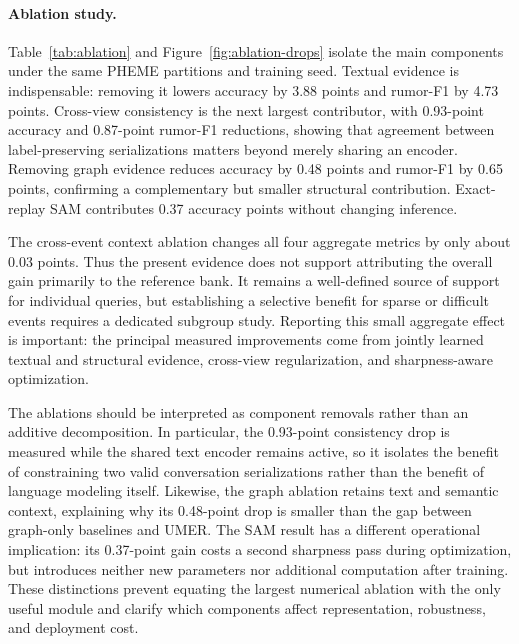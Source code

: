 \documentclass[sigconf,anonymous,review]{../acmart/acmart}
\newcommand{\method}{\textsc{UMER}}
\begin{document}
\paragraph{Ablation study.}
Table~\ref{tab:ablation} and Figure~\ref{fig:ablation-drops} isolate the main
components under the same PHEME partitions and training seed.  Textual evidence
is indispensable: removing it lowers accuracy by 3.88 points and rumor-F1 by
4.73 points.  Cross-view consistency is the next largest contributor, with
0.93-point accuracy and 0.87-point rumor-F1 reductions, showing that agreement
between label-preserving serializations matters beyond merely sharing an
encoder.  Removing graph evidence reduces accuracy by 0.48 points and
rumor-F1 by 0.65 points, confirming a complementary but smaller structural
contribution.  Exact-replay SAM contributes 0.37 accuracy points without
changing inference.

The cross-event context ablation changes all four aggregate metrics by only
about 0.03 points.  Thus the present evidence does not support attributing the
overall gain primarily to the reference bank.  It remains a well-defined source
of support for individual queries, but establishing a selective benefit for
sparse or difficult events requires a dedicated subgroup study.  Reporting
this small aggregate effect is important: the principal measured improvements
come from jointly learned textual and structural evidence, cross-view
regularization, and sharpness-aware optimization.

The ablations should be interpreted as component removals rather than an
additive decomposition.  In particular, the 0.93-point consistency drop is
measured while the shared text encoder remains active, so it isolates the
benefit of constraining two valid conversation serializations rather than the
benefit of language modeling itself.  Likewise, the graph ablation retains
text and semantic context, explaining why its 0.48-point drop is smaller than
the gap between graph-only baselines and \method.  The SAM result has a
different operational implication: its 0.37-point gain costs a second
sharpness pass during optimization, but introduces neither new parameters nor
additional computation after training.  These distinctions prevent equating
the largest numerical ablation with the only useful module and clarify which
components affect representation, robustness, and deployment cost.
\end{document}

